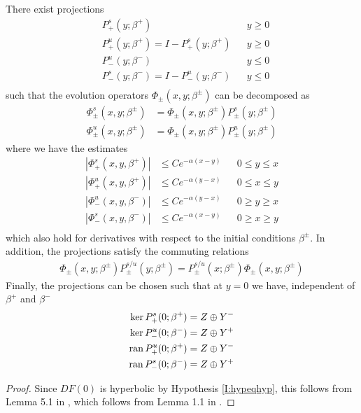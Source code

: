 \documentclass[thesis.tex]{subfiles}
\begin{document}
\begin{lemma}\label{dichotomy1}
There exist projections
\begin{align*}
&P_+^s(y; \beta^+) && y \geq 0 \\
&P_+^u(y; \beta^+) = I - P_+^s(y; \beta^+) && y \geq 0 \\
&P_-^u(y; \beta^-) && y \leq 0 \\
&P_-^s(y; \beta^-) = I - P_-^u(y; \beta^-) && y \leq 0 \\
\end{align*}
such that the evolution operators $\Phi_\pm(x, y; \beta^\pm)$ can be decomposed as
\begin{align*}
\Phi^s_\pm(x, y; \beta^\pm) &= \Phi_\pm(x, y; \beta^\pm) P^s_\pm(y; \beta^\pm) \\
\Phi^u_\pm(x, y; \beta^\pm) &= \Phi_\pm(x, y; \beta^\pm) P^u_\pm(y; \beta^\pm) 
\end{align*}
where we have the estimates
\begin{align*}
|\Phi^s_+(x, y, \beta^+)| &\leq C e^{-\alpha(x - y)} && 0 \leq y \leq x \\
|\Phi^u_+(x, y, \beta^+)| &\leq C e^{-\alpha(y - x)} && 0 \leq x \leq y \\
|\Phi^u_-(x, y, \beta^-)| &\leq C e^{-\alpha(y - x)} && 0 \geq y \geq x \\
|\Phi^s_-(x, y, \beta^-)| &\leq C e^{-\alpha(x - y)} && 0 \geq x \geq y \\
\end{align*}
which also hold for derivatives with respect to the initial conditions $\beta^\pm$. In addition, the projections satisfy the commuting relations
\begin{align*}
\Phi_\pm(x, y; \beta^\pm) P^{s/u}_\pm(y; \beta^\pm) 
= P^{s/u}_\pm(x; \beta^\pm) \Phi_\pm(x, y; \beta^\pm)
\end{align*}
Finally, the projections can be chosen such that at $y = 0$ we have, independent of $\beta^+$ and $\beta^-$
\begin{align*}
\ker P^s_+(0; \beta^+) &= Z \oplus Y^- \\
\ker P^u_-(0; \beta^-) &= Z \oplus Y^+ \\
\operatorname{ran} P^u_+(0; \beta^+) &= Z \oplus Y^- \\
\operatorname{ran} P^s_-(0; \beta^-) &= Z \oplus Y^+
\end{align*}

\begin{proof}
Since $DF(0)$ is hyperbolic by Hypothesis \ref{I:hypeqhyp}, this follows from Lemma 5.1 in \cite{Sandstede1997}, which follows from Lemma 1.1 in \cite{Sandstede1993}.
\end{proof}
\end{lemma}
\end{document}
